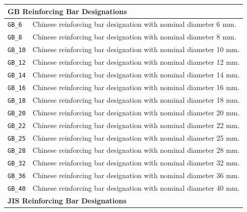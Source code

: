 \documentclass[11pt]{book}
\begin{document}
{\begin{longtable}{p{}p{}}
\hline
\multicolumn{2}{l}{\textbf{GB Reinforcing Bar Designations}}\\
\hline

\texttt{GB\_6} & Chinese reinforcing bar designation with nominal diameter 6 mm. \\
\texttt{GB\_8} & Chinese reinforcing bar designation with nominal diameter 8 mm. \\
\texttt{GB\_10} & Chinese reinforcing bar designation with nominal diameter 10 mm. \\
\texttt{GB\_12} & Chinese reinforcing bar designation with nominal diameter 12 mm. \\
\texttt{GB\_14} & Chinese reinforcing bar designation with nominal diameter 14 mm. \\
\texttt{GB\_16} & Chinese reinforcing bar designation with nominal diameter 16 mm. \\
\texttt{GB\_18} & Chinese reinforcing bar designation with nominal diameter 18 mm. \\
\texttt{GB\_20} & Chinese reinforcing bar designation with nominal diameter 20 mm. \\
\texttt{GB\_22} & Chinese reinforcing bar designation with nominal diameter 22 mm. \\
\texttt{GB\_25} & Chinese reinforcing bar designation with nominal diameter 25 mm. \\
\texttt{GB\_28} & Chinese reinforcing bar designation with nominal diameter 28 mm. \\
\texttt{GB\_32} & Chinese reinforcing bar designation with nominal diameter 32 mm. \\
\texttt{GB\_36} & Chinese reinforcing bar designation with nominal diameter 36 mm. \\
\texttt{GB\_40} & Chinese reinforcing bar designation with nominal diameter 40 mm. \\

\hline
\multicolumn{2}{l}{\textbf{JIS Reinforcing Bar Designations}}\\
\hline


\end{longtable}}
\end{document}

